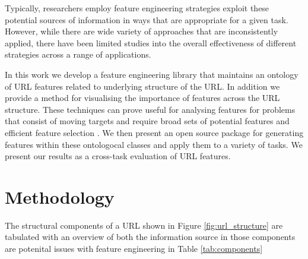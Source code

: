 \documentclass[sigconf]{acmart}
\begin{document}
Typically, researchers employ feature engineering strategies exploit these potential sources of information
in ways that are appropriate for a given task. However, while there are wide variety
of approaches that are inconsistently applied, there have been limited studies into
the overall effectiveness of different strategies across a range of applications.

In this work we develop a feature engineering library that maintains an ontology of URL features
related to underlying structure of the URL. In addition we provide a method for visualising the importance of features
across the URL structure. These techniques can prove useful for analysing features for problems that
consist of moving targets and require broad sets of potential features and efficient feature selection \cite{Basnet2012}.
We then present an open source package for generating features within these
ontologocal classes and apply them to a variety of tasks. We present our results as a
cross-task evaluation of URL features.

\section{Methodology}

The structural components of a URL shown in Figure \ref{fig:url_structure} are tabulated with an overview of both
the information source in those components are potenital issues with feature engineering in Table \ref{tab:components}
\end{document}
